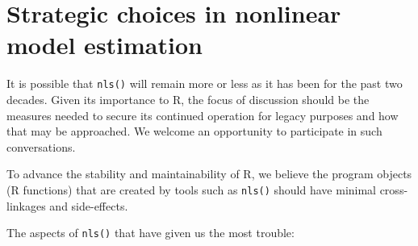 \hypertarget{strategic-choices-in-nonlinear-model-estimation}{%
\section{Strategic choices in nonlinear model estimation}\label{strategic-choices-in-nonlinear-model-estimation}}

It is possible that \texttt{nls()} will remain more or less as it has been for the past
two decades. Given its importance to R, the focus of discussion should be the
measures needed to secure its continued operation for legacy purposes and how
that may be approached.
We welcome an opportunity to participate in such conversations.

To advance the stability and maintainability of R, we believe the program objects (R
functions) that are created by tools such as \texttt{nls()} should have minimal
cross-linkages and side-effects.

The aspects of \texttt{nls()} that have given us the most trouble:

